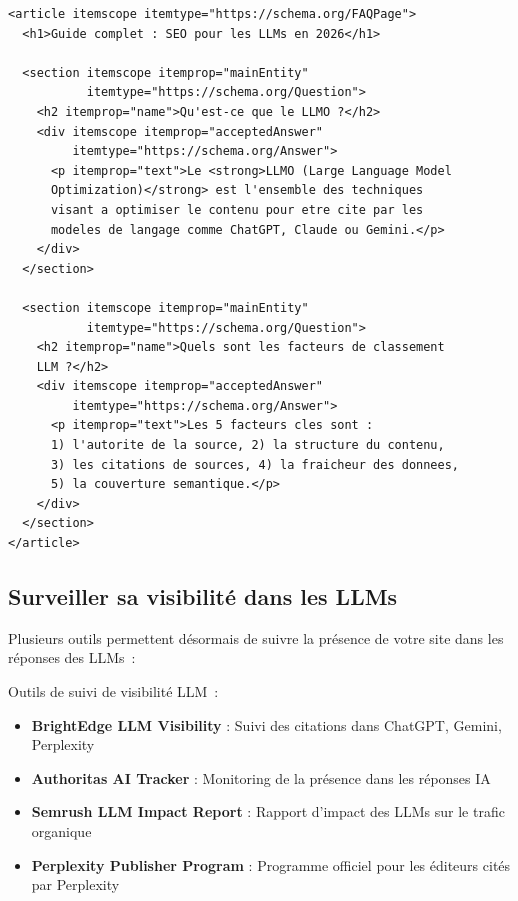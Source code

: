 \documentclass[12pt,a4paper,twoside]{report}
\begin{document}
\begin{lstlisting}[style=htmlcode,caption={Structure FAQ optimisée pour la citation par LLMs}]
<article itemscope itemtype="https://schema.org/FAQPage">
  <h1>Guide complet : SEO pour les LLMs en 2026</h1>
  
  <section itemscope itemprop="mainEntity" 
           itemtype="https://schema.org/Question">
    <h2 itemprop="name">Qu'est-ce que le LLMO ?</h2>
    <div itemscope itemprop="acceptedAnswer" 
         itemtype="https://schema.org/Answer">
      <p itemprop="text">Le <strong>LLMO (Large Language Model 
      Optimization)</strong> est l'ensemble des techniques 
      visant a optimiser le contenu pour etre cite par les 
      modeles de langage comme ChatGPT, Claude ou Gemini.</p>
    </div>
  </section>
  
  <section itemscope itemprop="mainEntity" 
           itemtype="https://schema.org/Question">
    <h2 itemprop="name">Quels sont les facteurs de classement 
    LLM ?</h2>
    <div itemscope itemprop="acceptedAnswer" 
         itemtype="https://schema.org/Answer">
      <p itemprop="text">Les 5 facteurs cles sont : 
      1) l'autorite de la source, 2) la structure du contenu, 
      3) les citations de sources, 4) la fraicheur des donnees, 
      5) la couverture semantique.</p>
    </div>
  </section>
</article>
\end{lstlisting}

\subsection{Surveiller sa visibilité dans les LLMs}

Plusieurs outils permettent désormais de suivre la présence de votre site dans les réponses des LLMs~:

\begin{toolsbox}
Outils de suivi de visibilité LLM~:
\begin{itemize}
    \item \textbf{BrightEdge LLM Visibility} : Suivi des citations dans ChatGPT, Gemini, Perplexity
    \item \textbf{Authoritas AI Tracker} : Monitoring de la présence dans les réponses IA
    \item \textbf{Semrush LLM Impact Report} : Rapport d'impact des LLMs sur le trafic organique
    \item \textbf{Perplexity Publisher Program} : Programme officiel pour les éditeurs cités par Perplexity
\end{itemize}
\end{toolsbox}
\end{document}
